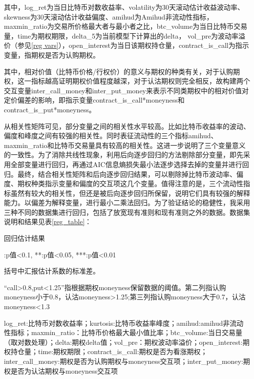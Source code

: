 \newpage
\restoregeometry
其中，log\_ret为当日比特币对数收益率、volatility为30天滚动估计收益波动率、skewness为30天滚动估计收益偏度、amihud为Amihud非流动性指标，maxmin\_ratio为交易所价格最大者与最小者之比，btc\_volume为当日比特币交易量，time为期权期限，delta\_5为当前模型下计算出的delta，
vol\_pre为波动率溢价（参见\ref{reg vars}），open\_interest为当日该期权持仓量，contract\_is\_call为指示变量，指期权是否为认购期权。
\par{其中，相对价值（比特币价格/行权价）的意义与期权的种类有关，对于认购期权，这一指标越高证明期权价值程度越深，对于认沽期权则完全相反，故构建两个交互变量inter\_call\_money和inter\_put\_money来表示不同类期权中的相对价值对定价偏差的影响，即指示变量contract\_is\_call*moneyness和contract\_is\_put*moneyness。}
\par{从相关性矩阵可见，部分变量之间的相关性水平较高。比如比特币收益率的波动、偏度和峰度之间有较强的相关性。同时表征流动性的三个指标amihud、maxmin\_ratio和比特币交易量具有较高的相关性。这进一步说明了三个变量意义的一致性。为了消除共线性现象，利用后向逐步回归的方法剔除部分变量，即先采用全部变量进行回归，再通过AIC信息熵损失最小法逐步选择去掉的变量并进行回归。最终，结合相关性矩阵和后向逐步回归结果，可以剔除掉比特币波动率、偏度、期权种类指示变量和偏度的交互项这几个变量。值得注意的是，三个流动性指标虽然有较大的相关性，但还是被后向逐步回归所保留，说明它们具有较强的解释能力。以偏差为解释变量，进行最小二乘法回归。为了验证结论的稳健性，我采用三种不同的数据集进行回归，包括了放宽现有准则和现有准则之外的数据。数据集说明和结果见表\ref{reg_table}：}
\newpage
{}
\begin{center}
\begin{threeparttable}[H]

\caption{回归估计结果}
\label{reg_table}


\begin{tablenotes}
\footnotesize
\item *:p值<0.1, **:p值<0.05, ***:p值<0.01
\item 括号中汇报估计系数的标准差。
\item “call>0.8,put<1.25”指根据期权moneyness保留数据的阈值。第二列指认购moneyness小于0.8，认沽moneyness>1.25;第三列指认购moneyness大于0.7，认沽moneyness<1.3
\item log\_ret:比特币对数收益率；kurtosis:比特币收益率峰度；amihud:amihud非流动性指标；maxmin\_ratio：比特币价格最大最小值比率；btc\_volume:当日交易量（取对数处理）；delta:期权delta值；vol\_pre：期权波动率溢价；open\_interest:期权持仓量；time:期权期限；contract\_is\_call:期权是否为看涨期权；inter\_call\_money:期权是否为认购期权与moneyness交互项；inter\_put\_money:期权是否为认沽期权与moneyness交互项
\end{tablenotes}
\end{threeparttable}
\end{center}
